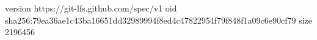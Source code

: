 version https://git-lfs.github.com/spec/v1
oid sha256:79ea36ae1c43ba16651dd32989994f8ed4c47822954f79f848f1a09c6e90cf79
size 2196456
